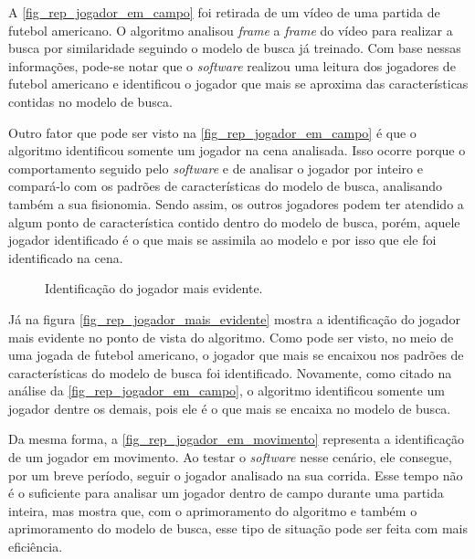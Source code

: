 A \autoref{fig_rep_jogador_em_campo} foi retirada de um vídeo de uma partida de futebol americano. O algoritmo analisou \textit{frame} a \textit{frame} do vídeo para realizar a busca por similaridade seguindo o modelo de busca já treinado. Com base nessas informações, pode-se notar que o \textit{software} realizou uma leitura dos jogadores de futebol americano e identificou o jogador que mais se aproxima das características contidas no modelo de busca.

Outro fator que pode ser visto na \autoref{fig_rep_jogador_em_campo} é que o algoritmo identificou somente um jogador na cena analisada. Isso ocorre porque o comportamento seguido pelo \textit{software} e de analisar o jogador por inteiro e compará-lo com os padrões de características do modelo de busca, analisando também a sua fisionomia. Sendo assim, os outros jogadores podem ter atendido a algum ponto de característica contido dentro do modelo de busca, porém, aquele jogador identificado é o que mais se assimila ao modelo e por isso que ele foi identificado na cena.

\begin{figure}[ht]
	\caption{\label{fig_rep_jogador_mais_evidente}Identificação do jogador mais evidente.}
	\begin{center}
	\end{center}
	\centering {}
\end{figure}

Já na figura \autoref{fig_rep_jogador_mais_evidente} mostra a identificação do jogador mais evidente no ponto de vista do algoritmo. Como pode ser visto, no meio de uma jogada de futebol americano, o jogador que mais se encaixou nos padrões de características do modelo de busca foi identificado. Novamente, como citado na análise da \autoref{fig_rep_jogador_em_campo}, o algoritmo identificou somente um jogador dentre os demais, pois ele é o que mais se encaixa no modelo de busca.

Da mesma forma, a \autoref{fig_rep_jogador_em_movimento} representa a identificação de um jogador em movimento. Ao testar o \textit{software} nesse cenário, ele consegue, por um breve período, seguir o jogador analisado na sua corrida. Esse tempo não é o suficiente para analisar um jogador dentro de campo durante uma partida inteira, mas mostra que, com o aprimoramento do algoritmo e também o aprimoramento do modelo de busca, esse tipo de situação pode ser feita com mais eficiência.

